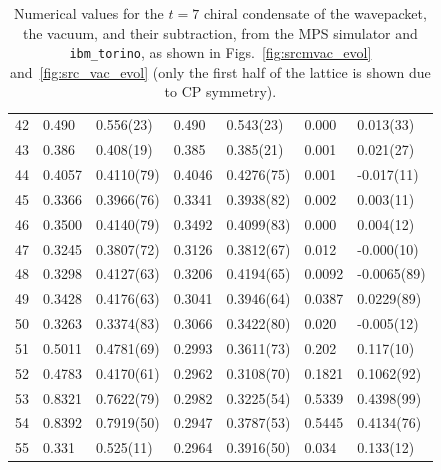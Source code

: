 \documentclass[aps, prc, tightenlines,superscriptaddress, letterpaper, amsmath, amssymb, preprintnumbers, floatfix, longbibliography, nofootinbib]{revtex4-2}
\begin{document}
\begin{table}[!htb]
{\begin{tabularx}{\textwidth}{| c || Y | Y | Y | Y | Y | Y |}
42	&	0.490	&	0.556(23)	&	0.490	&	0.543(23)	&	0.000	&	0.013(33)	\\
43	&	0.386	&	0.408(19)	&	0.385	&	0.385(21)	&	0.001	&	0.021(27)	\\
44	&	0.4057	&	0.4110(79)	&	0.4046	&	0.4276(75)	&	0.001	&	-0.017(11)	\\
45	&	0.3366	&	0.3966(76)	&	0.3341	&	0.3938(82)	&	0.002	&	0.003(11)	\\
46	&	0.3500	&	0.4140(79)	&	0.3492	&	0.4099(83)	&	0.000	&	0.004(12)	\\
47	&	0.3245	&	0.3807(72)	&	0.3126	&	0.3812(67)	&	0.012	&	-0.000(10)	\\
48	&	0.3298	&	0.4127(63)	&	0.3206	&	0.4194(65)	&	0.0092	&	-0.0065(89)	\\
49	&	0.3428	&	0.4176(63)	&	0.3041	&	0.3946(64)	&	0.0387	&	0.0229(89)	\\
50	&	0.3263	&	0.3374(83)	&	0.3066	&	0.3422(80)	&	0.020	&	-0.005(12)	\\
51	&	0.5011	&	0.4781(69)	&	0.2993	&	0.3611(73)	&	0.202	&	0.117(10)	\\
52	&	0.4783	&	0.4170(61)	&	0.2962	&	0.3108(70)	&	0.1821	&	0.1062(92)	\\
53	&	0.8321	&	0.7622(79)	&	0.2982	&	0.3225(54)	&	0.5339	&	0.4398(99)	\\
54	&	0.8392	&	0.7919(50)	&	0.2947	&	0.3787(53)	&	0.5445	&	0.4134(76)	\\
55	&	0.331	&	0.525(11)	&	0.2964	&	0.3916(50)	&	0.034	&	0.133(12)	\\ \hline
\end{tabularx}}
\caption{Numerical values for the $t=7$ chiral condensate of the wavepacket, the vacuum, and their subtraction, from the MPS simulator and {\tt ibm\_torino}, as shown in Figs.~\ref{fig:srcmvac_evol} and~\ref{fig:src_vac_evol} (only the first half of the lattice is shown due to CP symmetry).}
 \label{tab:tablet7}
\end{table}
%
\end{document}
